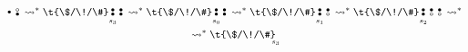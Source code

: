 \begin{primjer}
\begin{multline}
{\begin{array}{@{}c@{}}
    \text\textbullet
    \end{array}}
    \begin{array}{@{}c@{}}
    \text\textopenbullet\\
    \text\textbullet
    \end{array}
        \leadsto^*
    \t{\$/\!/\#}
    \underset{\mathclap{s_3}}{\begin{array}{@{}c@{}}
    \text\textbullet\\
    \text\textbullet
    \end{array}}
    \begin{array}{@{}c@{}}
    \text\textbullet\\
    \text\textbullet
    \end{array}
        \leadsto^*
    \t{\$/\!/\#}
    \underset{\mathclap{s_0}}{\begin{array}{@{}c@{}}
    \text\textbullet\\
    \text\textbullet
    \end{array}}
    \begin{array}{@{}c@{}}
    \text\textbullet\\
    \text\textbullet
    \end{array}
        \leadsto^*
    \t{\$/\!/\#}
    \underset{\mathclap{s_1}}{\begin{array}{@{}c@{}}
    \text\textbullet\\
    \text\textbullet
    \end{array}}
    \begin{array}{@{}c@{}}
    \text\textbullet\\
    \text\textopenbullet
    \end{array}
        \leadsto^*
    \t{\$/\!/\#}
    \underset{\mathclap{s_2}}{\begin{array}{@{}c@{}}
    \text\textbullet\\
    \text\textbullet
    \end{array}}
    \begin{array}{@{}c@{}}
    \text\textbullet\\
    \text\textopenbullet
    \end{array}
    \begin{array}{@{}c@{}}
    \text\textbullet\\
    \text\textopenbullet
    \end{array}
        \leadsto^*\\
\renewcommand{\arraystretch}{0.1}
        \leadsto^*
    \t{\$/\!/\#}
    \underset{\mathclap{s_3}}{\begin{array}{@{}c@{}}

\end{array}}
\end{multline}
\end{primjer}
